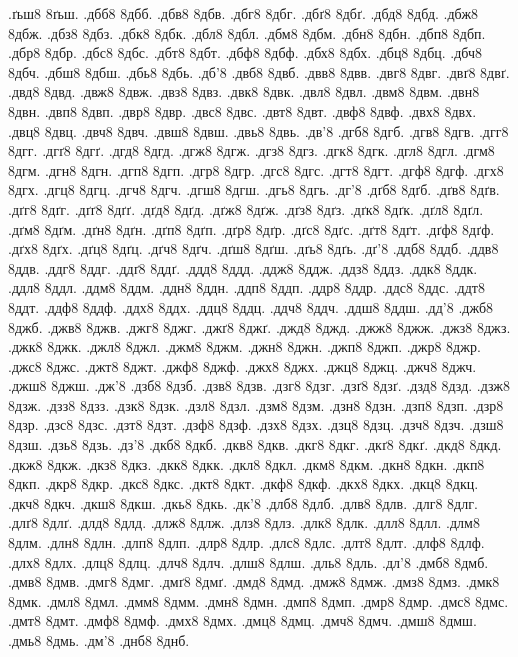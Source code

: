 {.ґьш8 8ґьш.
.дбб8 8дбб.
.дбв8 8дбв.
.дбг8 8дбг.
.дбґ8 8дбґ.
.дбд8 8дбд.
.дбж8 8дбж.
.дбз8 8дбз.
.дбк8 8дбк.
.дбл8 8дбл.
.дбм8 8дбм.
.дбн8 8дбн.
.дбп8 8дбп.
.дбр8 8дбр.
.дбс8 8дбс.
.дбт8 8дбт.
.дбф8 8дбф.
.дбх8 8дбх.
.дбц8 8дбц.
.дбч8 8дбч.
.дбш8 8дбш.
.дбь8 8дбь.
.дб'8
.двб8 8двб.
.двв8 8двв.
.двг8 8двг.
.двґ8 8двґ.
.двд8 8двд.
.двж8 8двж.
.двз8 8двз.
.двк8 8двк.
.двл8 8двл.
.двм8 8двм.
.двн8 8двн.
.двп8 8двп.
.двр8 8двр.
.двс8 8двс.
.двт8 8двт.
.двф8 8двф.
.двх8 8двх.
.двц8 8двц.
.двч8 8двч.
.двш8 8двш.
.двь8 8двь.
.дв'8
.дгб8 8дгб.
.дгв8 8дгв.
.дгг8 8дгг.
.дгґ8 8дгґ.
.дгд8 8дгд.
.дгж8 8дгж.
.дгз8 8дгз.
.дгк8 8дгк.
.дгл8 8дгл.
.дгм8 8дгм.
.дгн8 8дгн.
.дгп8 8дгп.
.дгр8 8дгр.
.дгс8 8дгс.
.дгт8 8дгт.
.дгф8 8дгф.
.дгх8 8дгх.
.дгц8 8дгц.
.дгч8 8дгч.
.дгш8 8дгш.
.дгь8 8дгь.
.дг'8
.дґб8 8дґб.
.дґв8 8дґв.
.дґг8 8дґг.
.дґґ8 8дґґ.
.дґд8 8дґд.
.дґж8 8дґж.
.дґз8 8дґз.
.дґк8 8дґк.
.дґл8 8дґл.
.дґм8 8дґм.
.дґн8 8дґн.
.дґп8 8дґп.
.дґр8 8дґр.
.дґс8 8дґс.
.дґт8 8дґт.
.дґф8 8дґф.
.дґх8 8дґх.
.дґц8 8дґц.
.дґч8 8дґч.
.дґш8 8дґш.
.дґь8 8дґь.
.дґ'8
.ддб8 8ддб.
.ддв8 8ддв.
.ддг8 8ддг.
.ддґ8 8ддґ.
.ддд8 8ддд.
.ддж8 8ддж.
.ддз8 8ддз.
.ддк8 8ддк.
.ддл8 8ддл.
.ддм8 8ддм.
.ддн8 8ддн.
.ддп8 8ддп.
.ддр8 8ддр.
.ддс8 8ддс.
.ддт8 8ддт.
.ддф8 8ддф.
.ддх8 8ддх.
.ддц8 8ддц.
.ддч8 8ддч.
.ддш8 8ддш.
.дд'8
.джб8 8джб.
.джв8 8джв.
.джг8 8джг.
.джґ8 8джґ.
.джд8 8джд.
.джж8 8джж.
.джз8 8джз.
.джк8 8джк.
.джл8 8джл.
.джм8 8джм.
.джн8 8джн.
.джп8 8джп.
.джр8 8джр.
.джс8 8джс.
.джт8 8джт.
.джф8 8джф.
.джх8 8джх.
.джц8 8джц.
.джч8 8джч.
.джш8 8джш.
.дж'8
.дзб8 8дзб.
.дзв8 8дзв.
.дзг8 8дзг.
.дзґ8 8дзґ.
.дзд8 8дзд.
.дзж8 8дзж.
.дзз8 8дзз.
.дзк8 8дзк.
.дзл8 8дзл.
.дзм8 8дзм.
.дзн8 8дзн.
.дзп8 8дзп.
.дзр8 8дзр.
.дзс8 8дзс.
.дзт8 8дзт.
.дзф8 8дзф.
.дзх8 8дзх.
.дзц8 8дзц.
.дзч8 8дзч.
.дзш8 8дзш.
.дзь8 8дзь.
.дз'8
.дкб8 8дкб.
.дкв8 8дкв.
.дкг8 8дкг.
.дкґ8 8дкґ.
.дкд8 8дкд.
.дкж8 8дкж.
.дкз8 8дкз.
.дкк8 8дкк.
.дкл8 8дкл.
.дкм8 8дкм.
.дкн8 8дкн.
.дкп8 8дкп.
.дкр8 8дкр.
.дкс8 8дкс.
.дкт8 8дкт.
.дкф8 8дкф.
.дкх8 8дкх.
.дкц8 8дкц.
.дкч8 8дкч.
.дкш8 8дкш.
.дкь8 8дкь.
.дк'8
.длб8 8длб.
.длв8 8длв.
.длг8 8длг.
.длґ8 8длґ.
.длд8 8длд.
.длж8 8длж.
.длз8 8длз.
.длк8 8длк.
.длл8 8длл.
.длм8 8длм.
.длн8 8длн.
.длп8 8длп.
.длр8 8длр.
.длс8 8длс.
.длт8 8длт.
.длф8 8длф.
.длх8 8длх.
.длц8 8длц.
.длч8 8длч.
.длш8 8длш.
.дль8 8дль.
.дл'8
.дмб8 8дмб.
.дмв8 8дмв.
.дмг8 8дмг.
.дмґ8 8дмґ.
.дмд8 8дмд.
.дмж8 8дмж.
.дмз8 8дмз.
.дмк8 8дмк.
.дмл8 8дмл.
.дмм8 8дмм.
.дмн8 8дмн.
.дмп8 8дмп.
.дмр8 8дмр.
.дмс8 8дмс.
.дмт8 8дмт.
.дмф8 8дмф.
.дмх8 8дмх.
.дмц8 8дмц.
.дмч8 8дмч.
.дмш8 8дмш.
.дмь8 8дмь.
.дм'8
.днб8 8днб.
}
